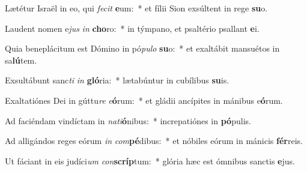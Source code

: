 \item Lætétur Israël in eo, qui \textit{fe}\textit{cit} \textbf{e}um:~* et fílii Sion exsúltent in rege \textbf{su}o.
\item Laudent nomen e\textit{jus} \textit{in} \textbf{cho}ro:~* in týmpano, et psaltério psallant \textbf{e}i.
\item Quia beneplácitum est Dómino in pó\textit{pu}\textit{lo} \textbf{su}o:~* et exaltábit mansuétos in sa\textbf{lú}tem.
\item Exsultábunt sanc\textit{ti} \textit{in} \textbf{gló}ria:~* lætabúntur in cubílibus \textbf{su}is.
\item Exaltatiónes Dei in gúttu\textit{re} \textit{e}\textbf{ó}rum:~* et gládii ancípites in mánibus e\textbf{ó}rum.
\item Ad faciéndam vindíctam in \textit{na}\textit{ti}\textbf{ó}nibus:~* increpatiónes in \textbf{pó}pulis.
\item Ad alligándos reges eórum \textit{in} \textit{com}\textbf{pé}dibus:~* et nóbiles eórum in mánicis \textbf{fér}reis.
\item Ut fáciant in eis judíci\textit{um} \textit{con}\textbf{scríp}tum:~* glória hæc est ómnibus sanctis \textbf{e}jus.

